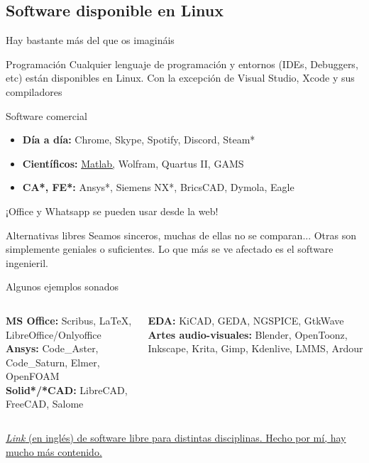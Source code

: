 \documentclass[12pt]{beamer}
\begin{document}
\subsection{Software disponible en Linux}

\begin{frame}{Hay bastante más del que os imagináis}
	\begin{block}{Programación}
		Cualquier lenguaje de programación y entornos (IDEs, Debuggers, etc) están disponibles en Linux. Con la excepción de Visual Studio, Xcode y sus compiladores
	\end{block}
	\begin{block}{Software comercial}
		\begin{itemize}
			\item \textbf{Día a día:} Chrome, Skype, Spotify, Discord, Steam*
			\item \textbf{Científicos:} \underline{Matlab,} Wolfram, Quartus II, GAMS 
			\item \textbf{CA*, FE*:} Ansys*, Siemens NX*, BricsCAD, Dymola, Eagle
		\end{itemize}		 		
	\end{block}
	¡Office y Whatsapp se pueden usar desde la web!
\end{frame}

\begin{frame}{Alternativas libres}
	Seamos sinceros, muchas de ellas no se comparan... Otras son simplemente geniales o suficientes. Lo que más se ve afectado es el software ingenieril.
	\begin{block}{Algunos ejemplos sonados}
		\vspace*{0.5em}
		\begin{columns}
			\begin{column}{0.45\textwidth}
				\textbf{MS Office:} Scribus, \LaTeX, LibreOffice/Onlyoffice\\
				\textbf{Ansys:} Code\_Aster, Code\_Saturn, Elmer, OpenFOAM\\
				\textbf{Solid*/*CAD:} LibreCAD, FreeCAD, Salome
			\end{column}
			\begin{column}{0.45\textwidth}
				\textbf{EDA:} KiCAD, GEDA, NGSPICE, GtkWave\\
				\textbf{Artes audio-visuales:} Blender, OpenToonz, Inkscape, Krita, Gimp, Kdenlive, LMMS, Ardour
			\end{column}
		\end{columns}
	\end{block}
	\href{https://github.com/Irvise/Documents/blob/master/Cheatsheets/Libre/Packages.md}{\textit{Link} (en inglés) de software libre para distintas disciplinas. Hecho por mí, hay mucho más contenido.}
\end{frame}
\end{document}
